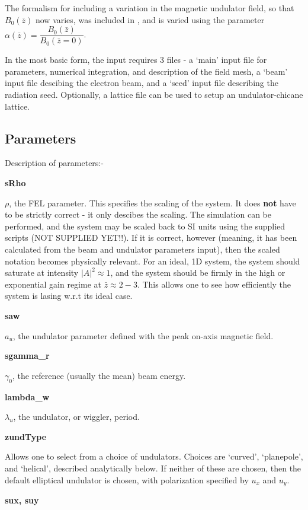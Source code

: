 \documentclass[12pt]{article}%
\begin{document}
The formalism for including a variation in the magnetic undulator field, so that $B_0(\bar{z})$ now varies, was included in \cite{2col}, and is varied using the parameter $\alpha(\bar{z}) = \dfrac{B_0(\bar{z})}{B_0(\bar{z}=0)}$.

In the most basic form, the input requires 3 files - a `main' input file for parameters, numerical integration, and description of the field mesh, a `beam' input file descibing the electron beam, and a `seed' input file describing the radiation seed. Optionally, a lattice file can be used to setup an undulator-chicane lattice.

\subsection{Parameters}

Description of parameters:-

{\bf sRho}

$\rho$, the FEL parameter. This specifies the scaling of the system. It does {\bf not} have to be strictly correct - it only descibes the scaling. The simulation can be performed, and the system may be scaled back to SI units using the supplied scripts (NOT SUPPLIED YET!!). If it is correct, however (meaning, it has been calculated from the beam and undulator parameters input), then the scaled notation becomes physically relevant. For an ideal, 1D system, the system should saturate at intensity $|A|^2 \approx 1$, and the system should be firmly in the high or exponential gain regime at $\bar{z} \approx 2-3$. This allows one to see how efficiently the system is lasing w.r.t its ideal case.


{\bf saw}

$a_u$, the undulator parameter defined with the peak on-axis magnetic field.

{\bf sgamma\_r}

$\gamma_0$, the reference (usually the mean) beam energy.

{\bf lambda\_w}

$\lambda_u$, the undulator, or wiggler, period.

{\bf zundType}

Allows one to select from a choice of undulators. Choices are `curved', `planepole', and `helical', described analytically below. If neither of these are chosen, then the default elliptical undulator is chosen, with polarization specified by $u_x$ and $u_y$.

{\bf sux, suy}
\end{document}
